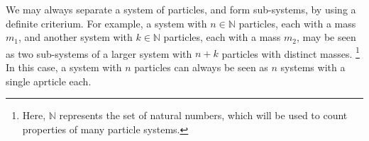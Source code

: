 We may always separate a system of particles, and form sub-systems, by using a definite criterium. For example, a system with $n\in\mathbb{N}$ particles, each with a mass $m_1$, and another system with $k\in\mathbb{N}$ particles, each with a mass $m_2$, may be seen as two sub-systems of a larger system with $n+k$ particles with distinct masses. \footnote{Here, $\mathbb{N}$ represents the set of natural numbers, which will be used to count properties of many particle systems.} In this case, a system with $n$ particles can always be seen as $n$ systems with a single aprticle each.